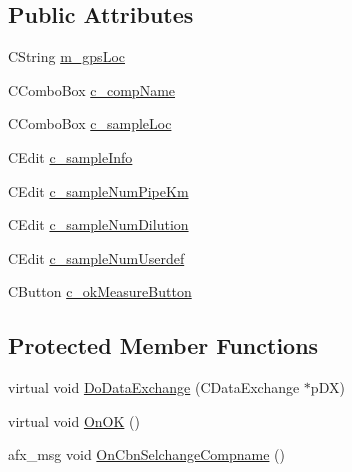 \subsection*{Public Attributes}
\begin{DoxyCompactItemize}
\item 
CString \hyperlink{classCCustomerInfoDialog_abea1dd37fe0b172b4adbfb0c8bedbb09}{m\_\-gpsLoc}
\item 
CComboBox \hyperlink{classCCustomerInfoDialog_acb8d4e1a73a7d331e7c656224cedd9a6}{c\_\-compName}
\item 
CComboBox \hyperlink{classCCustomerInfoDialog_ab356765b7483e284f12a3f3629d53899}{c\_\-sampleLoc}
\item 
CEdit \hyperlink{classCCustomerInfoDialog_a22e65d8624be21f0c8dd44622b8730c9}{c\_\-sampleInfo}
\item 
CEdit \hyperlink{classCCustomerInfoDialog_a6ef7723f95eb2d1cd068df73b2b00513}{c\_\-sampleNumPipeKm}
\item 
CEdit \hyperlink{classCCustomerInfoDialog_a30b8466db0068dd8f7e8e14b3333f3ae}{c\_\-sampleNumDilution}
\item 
CEdit \hyperlink{classCCustomerInfoDialog_af017867d4e5c63f7a789df5936039aa5}{c\_\-sampleNumUserdef}
\item 
CButton \hyperlink{classCCustomerInfoDialog_af8352bb152c9c8be8daa68e171c87c5e}{c\_\-okMeasureButton}
\end{DoxyCompactItemize}
\subsection*{Protected Member Functions}
\begin{DoxyCompactItemize}
\item 
virtual void \hyperlink{classCCustomerInfoDialog_a13dd0d69467d17dc075a517f73045c49}{DoDataExchange} (CDataExchange $\ast$pDX)
\item 
virtual void \hyperlink{classCCustomerInfoDialog_aa25198c33b2be2ab293f08980fdc4120}{OnOK} ()
\item 
afx\_\-msg void \hyperlink{classCCustomerInfoDialog_ade40023416ade76b46b2b63f3f64850d}{OnCbnSelchangeCompname} ()
\end{DoxyCompactItemize}
